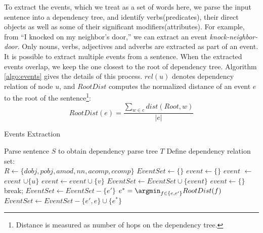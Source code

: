 To extract the events, which we treat as a set of words here, we
parse the input sentence into a dependency tree, and identify
verbs(predicates), their direct objects as well as
some of their significant modifiers(attributes).
For example, from ``I knocked on my neighbor's door,'' we can
extract an event {\em knock-neighbor-door}. Only nouns, verbs,
adjectives and adverbs are extracted as part of an event. It is
possible to extract multiple events from a sentence.
When the extracted events overlap,
we keep the one closest to the root of dependency tree.
Algorithm \ref{algo:events} gives the details of
this process. $rel(u)$ denotes dependency relation of node $u$,
and $RootDist$ computes the normalized distance of an event $e$ to
the root of the sentence\footnote{Distance is measured as number of hops
on the dependency tree.}:
\begin{equation}
RootDist(e) = \frac{\sum_{w \in e} dist(Root, w)}{|e|}
\end{equation}
%
\begin{algorithm}[th]
\caption{Events Extraction}
\label{algo:events}
\begin{algorithmic}[1]
\begin{small}
\State Parse sentence $S$ to obtain dependency parse tree $T$
\State Define dependency relation set: \\
\quad \quad $R \leftarrow \{dobj, pobj, amod, nn, acomp, ccomp\}$
\State $EventSet \leftarrow \{\}$
\State $event \leftarrow \{\}$
\State $event$ $\leftarrow$ $event$ $\cup \{u\}$
\State $event \leftarrow event \cup \{v\}$
\State $EventSet \leftarrow EventSet \cup \{event\}$
\State $event \leftarrow \{\}$
\State break;
\EndIf
\EndWhile
\EndFor
{}
\State $EventSet \leftarrow EventSet -\{e'\}$
\EndIf
{}
\State $e^{*} = \argmin_{f \in \{e, e'\}} RootDist(f)$
\State $EventSet \leftarrow EventSet - \{e', e\} \cup \{e^{*}\}$
\EndIf
\EndFor
\end{small}
\end{algorithmic}
\end{algorithm}

